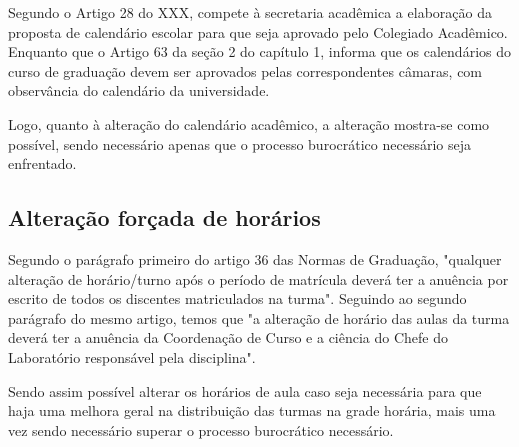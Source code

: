 Segundo o Artigo 28 do XXX, compete à secretaria acadêmica a elaboração da proposta de calendário escolar para que seja aprovado pelo Colegiado Acadêmico. Enquanto que o Artigo 63 da seção 2 do capítulo 1, informa que os calendários do curso de graduação devem ser aprovados pelas correspondentes câmaras, com observância do calendário da universidade.

Logo, quanto à alteração do calendário acadêmico, a alteração mostra-se como possível, sendo necessário apenas que o processo burocrático necessário seja enfrentado.

\subsection{Alteração forçada de horários}


Segundo o parágrafo primeiro do artigo 36 das Normas de Graduação, "qualquer alteração de horário/turno após o período de matrícula deverá ter a anuência por escrito de todos os discentes matriculados na turma". Seguindo ao segundo parágrafo do mesmo artigo, temos que "a alteração de horário das aulas da turma deverá ter a anuência da Coordenação de Curso e a ciência do Chefe do Laboratório responsável pela disciplina".

Sendo assim possível alterar os horários de aula caso seja necessária para que haja uma melhora geral na distribuição das turmas na grade horária, mais uma vez sendo necessário superar o processo burocrático necessário.
